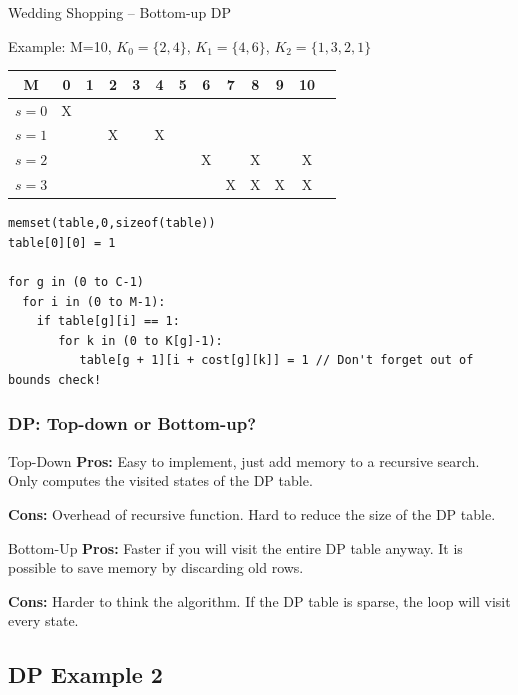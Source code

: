 \begin{frame}[fragile]{Wedding Shopping -- Bottom-up DP}

  Example: M=10, $K_0=\{2,4\}$, $K_1=\{4,6\}$, $K_2=\{1,3,2,1\}$
  \bigskip

  \begin{tabular}{|c||c|c|c|c|c|c|c|c|c|c|c|c|}
    \hline
    M & 0 & 1 & 2 & 3 & 4 & 5 & 6 & 7 & 8 & 9 & 10\\
    \hline
    $s=0$ & X & & & & & & & & & & \\
    $s=1$ & & & X & & X & & & & & & \\
    $s=2$ & & & & & & & X & & X & & X\\
    $s=3$ & & & & & & & & X & X & X & X\\
    \hline
  \end{tabular}
  {\smaller
  \begin{block}{}
\begin{verbatim}
memset(table,0,sizeof(table))
table[0][0] = 1

for g in (0 to C-1)
  for i in (0 to M-1):
    if table[g][i] == 1:
       for k in (0 to K[g]-1):
          table[g + 1][i + cost[g][k]] = 1 // Don't forget out of bounds check!
\end{verbatim}
  \end{block}}
\end{frame}

\begin{frame}
  \frametitle{DP: Top-down or Bottom-up?}

  \begin{block}{Top-Down}
    {\bf Pros:} Easy to implement, just add memory to a recursive search. Only computes the visited states of the DP table. \medskip

    {\bf Cons:} Overhead of recursive function. Hard to reduce the size of the DP table.
  \end{block}

  \begin{block}{Bottom-Up}
    {\bf Pros:} Faster if you will visit the entire DP table anyway. It is possible to save memory by discarding old rows.\medskip

    {\bf Cons:} Harder to think the algorithm. If the DP table is sparse, the loop will visit every state.
  \end{block}
\end{frame}

\subsection{DP Example 2}

